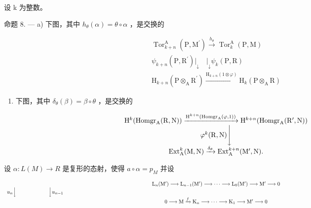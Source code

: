 设 k 为整数。

命题 8. --- a) 下图，其中 \(h_{\theta}(\alpha) = \theta \circ \alpha\) ，是交换的

\[
\begin{array}{c} \operatorname{Tor} _ {k + n} ^ {\mathrm{A}} (\mathrm{P}, \mathrm{M} ^ {\prime}) \xrightarrow {h _ {\theta}} \operatorname{Tor} _ {k} ^ {\mathrm{A}} (\mathrm{P}, \mathrm{M}) \\ \psi_ {k + n} (\mathrm{P}, \mathrm{R} ^ {\prime}) \Big | _ {\downarrow} \quad \Big | _ {\downarrow} \psi_ {k} (\mathrm{P}, \mathrm{R}) \\ \mathrm{H} _ {k + n} (\mathrm{P} \otimes_ {\mathrm{A}} \mathrm{R} ^ {\prime}) \xrightarrow {\mathrm{H} _ {k + n} (1 \otimes \varphi)} \mathrm{H} _ {k} (\mathrm{P} \otimes_ {\mathrm{A}} \mathrm{R}) \end{array}
\]

\begin{enumerate}
\def\labelenumi{\alph{enumi})}
\setcounter{enumi}{1}
\tightlist
\item
  下图，其中 \(\delta_{\theta}(\beta) = \beta \circ \theta\) ，是交换的
\end{enumerate}

\[
\begin{array}{c} \mathrm{H} ^ {k} (\text {Homgr} _ {\mathrm{A}} (\mathrm{R}, \mathrm{N})) \xrightarrow {\mathrm{H} ^ {k + n} (\text {Homgr} _ {\mathrm{A}} (\varphi , 1))} \mathrm{H} ^ {k + n} (\text {Homgr} _ {\mathrm{A}} (\mathrm{R} ^ {\prime}, \mathrm{N})) \\ \varphi^ {k} (\mathrm{R}, \mathrm{N}) \Biggl \downarrow \\ \operatorname{Ext} _ {\mathrm{A}} ^ {k} (\mathrm{M}, \mathrm{N}) \xrightarrow {\delta_ {\theta}} \operatorname{Ext} _ {\mathrm{A}} ^ {k + n} (\mathrm{M} ^ {\prime}, \mathrm{N}). \end{array}
\]

设 \(\alpha : L(M) \to R\) 是复形的态射，使得 \(a \circ \alpha = p_{M}\) 并设

\[
\begin{array}{c} \mathrm{L} _ {n} (\mathrm{M} ^ {\prime}) \longrightarrow \mathrm{L} _ {n - 1} (\mathrm{M} ^ {\prime}) \longrightarrow \dots \longrightarrow \mathrm{L} _ {0} (\mathrm{M} ^ {\prime}) \longrightarrow \mathrm{M} ^ {\prime} \longrightarrow 0 \\ u _ {n} \Big \downarrow \qquad \qquad \qquad \Big \downarrow u _ {n - 1} \qquad \qquad \qquad \qquad \qquad \qquad \qquad \qquad \qquad \qquad \qquad \qquad \qquad \qquad \qquad \qquad \qquad \qquad \qquad \qquad \qquad \qquad \qquad \qquad \qquad \qquad \qquad \qquad \qquad \qquad \qquad \qquad \qquad \qquad \\ 0 \longrightarrow \mathrm{M} \xrightarrow {f} \mathrm{K} _ {n} \longrightarrow \dots \longrightarrow \mathrm{K} _ {1} \longrightarrow \mathrm{M} ^ {\prime} \longrightarrow 0 \end{array}
\]

